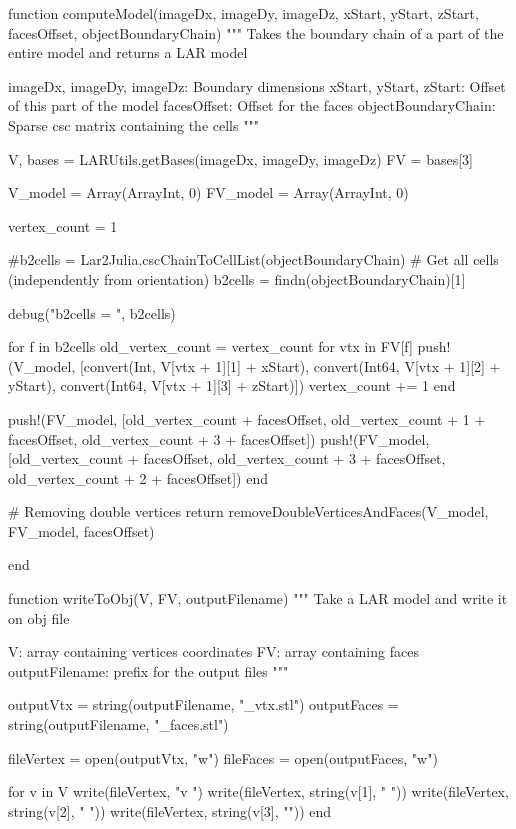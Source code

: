 \documentclass[11pt,oneside]{article}	%
\begin{document}
{function computeModel(imageDx, imageDy, imageDz,
                      xStart, yStart, zStart,
                      facesOffset, objectBoundaryChain)
  """
  Takes the boundary chain of a part of the entire model
  and returns a LAR model

  imageDx, imageDy, imageDz: Boundary dimensions
  xStart, yStart, zStart: Offset of this part of the model
  facesOffset: Offset for the faces
  objectBoundaryChain: Sparse csc matrix containing the cells
  """

  V, bases = LARUtils.getBases(imageDx, imageDy, imageDz)
  FV = bases[3]

  V_model = Array(Array{Int}, 0)
  FV_model = Array(Array{Int}, 0)

  vertex_count = 1

  #b2cells = Lar2Julia.cscChainToCellList(objectBoundaryChain)
  # Get all cells (independently from orientation)
  b2cells = findn(objectBoundaryChain)[1]

  debug("b2cells = ", b2cells)

  for f in b2cells
    old_vertex_count = vertex_count
    for vtx in FV[f]
      push!(V_model, [convert(Int, V[vtx + 1][1] + xStart),
                    convert(Int64, V[vtx + 1][2] + yStart),
                    convert(Int64, V[vtx + 1][3] + zStart)])
      vertex_count += 1
    end

    push!(FV_model, [old_vertex_count + facesOffset, old_vertex_count + 1 + facesOffset, old_vertex_count + 3 + facesOffset])
    push!(FV_model, [old_vertex_count + facesOffset, old_vertex_count + 3 + facesOffset, old_vertex_count + 2 + facesOffset])
  end

  # Removing double vertices
  return removeDoubleVerticesAndFaces(V_model, FV_model, facesOffset)

end

function writeToObj(V, FV, outputFilename)
  """
  Take a LAR model and write it on obj file

  V: array containing vertices coordinates
  FV: array containing faces
  outputFilename: prefix for the output files
  """

  outputVtx = string(outputFilename, "_vtx.stl")
  outputFaces = string(outputFilename, "_faces.stl")

  fileVertex = open(outputVtx, "w")
  fileFaces = open(outputFaces, "w")

  for v in V
    write(fileVertex, "v ")
    write(fileVertex, string(v[1], " "))
    write(fileVertex, string(v[2], " "))
    write(fileVertex, string(v[3], "\n"))
  end

}
\end{document}
